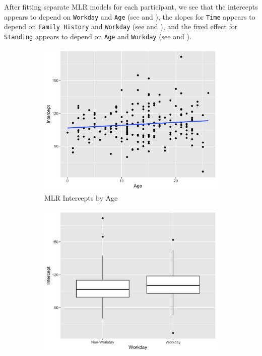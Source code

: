 \documentclass[12pt,twoside,leqno,fleqn,letterpaper]{article}
\theoremstyle{definition}
\theoremstyle{definition}
\begin{document}
After fitting separate MLR models for each participant, we see that the intercepts appears to depend on \texttt{Workday} and \texttt{Age} (see  and ), the slopes for \texttt{Time} appears to depend on \texttt{Family History} and \texttt{Workday} (see  and ), and the fixed effect for \texttt{Standing} appears to depend on \texttt{Age} and \texttt{Workday} (see  and ).

\begin{figure} 
    \centering
    \begin{subfigure}[b]{0.32\textwidth}
    \centering
    \includegraphics[width=\textwidth]{pics/mlr int by age.png}
    \caption[]%
    {{\small MLR Intercepts by Age}}
    \label{fig: int v age}
    \end{subfigure}
    \hfill
    \begin{subfigure}[b]{0.32\textwidth}
    \centering
    \includegraphics[width=\textwidth]{pics/mlr int by day.png}

\end{subfigure}
\end{figure}
\end{document}
